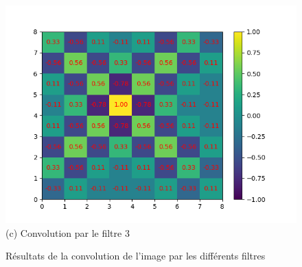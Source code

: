 \begin{figure}[h]
        \includegraphics[width=\textwidth]{img/cnn_exemple/cross/convolution_filtre_3.png}
        \center
        (c) Convolution par le filtre 3
    \endminipage
    \center 
    \caption{Résultats de la convolution de l'image par les différents filtres}
\end{figure}

